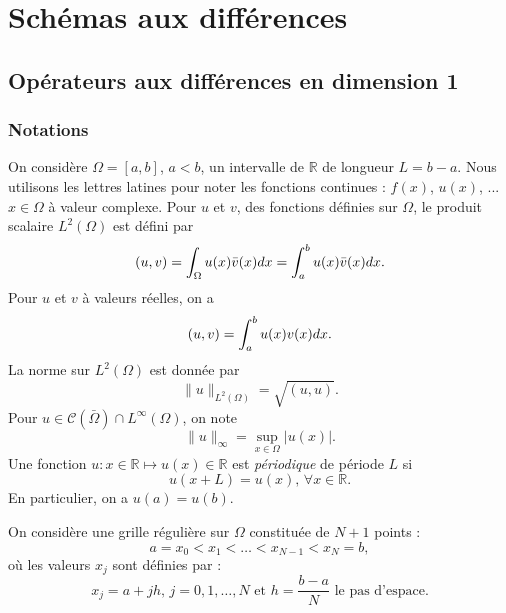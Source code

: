 \chapter{Schémas aux différences}
\label{chap:1}

\section{Opérateurs aux différences en dimension 1}

\subsection{Notations}
\label{sec:notation_1D}

On considère $\Omega = [a,b]$, $a<b$, un intervalle de $\mathbb{R}$ de longueur $L=b-a$. Nous utilisons les lettres latines pour noter les fonctions continues : $f(x)$, $u(x)$, ... $x \in \Omega$ à valeur complexe. Pour $u$ et $v$, des fonctions définies sur $\Omega$, le produit scalaire $L^2 ( \Omega )$ est défini par
\begin{equation}
(u,v) = \displaystyle\int_{\Omega} u(x) \bar{v}(x) dx = \displaystyle\int_{a}^b u(x) \bar{v}(x) dx.
\end{equation}
Pour $u$ et $v$ à valeurs réelles, on a
\begin{equation}
(u,v) = \displaystyle\int_{a}^b u(x) v(x) dx.
\end{equation}
La norme sur $L^2(\Omega)$ est donnée par
\begin{equation}
\| u \|_{L^2(\Omega)} = \sqrt{(u,u)}.
\end{equation}
Pour $u \in \mathcal
C(\bar{\Omega}) \cap L^{\infty}(\Omega)$, on note
\begin{equation}
\| u \|_{\infty} = \sup_{x\in\Omega} |u(x)|.
\end{equation}
Une fonction $u : x \in \mathbb{R} \mapsto u(x) \in \mathbb{R}$ est \textit{périodique} de période $L$ si 
\begin{equation}
u(x+L) = u(x) \text{, } \forall x \in \mathbb{R}.
\end{equation}
En particulier, on a $u(a)=u(b)$.

On considère une grille régulière sur $\Omega$ constituée de $N + 1$ points :
\begin{equation}
a=x_0 < x_1 < \ldots < x_{N-1} < x_N = b,
\end{equation}
où les valeurs $x_j$ sont définies par :
\begin{equation}
x_j = a + j h\text{, } j = 0,1, \ldots,N \text{ et } h = \dfrac{b-a}{N} \text{ le pas d'espace}. 
\end{equation}

